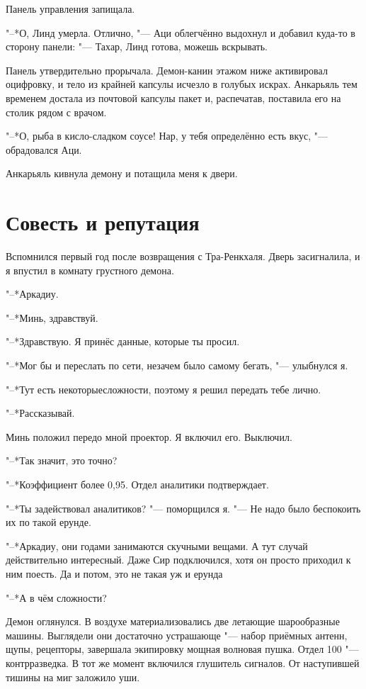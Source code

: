 Панель управления запищала.

"--*О, Линд умерла.
Отлично, "--- Аци облегчённо выдохнул и добавил куда-то в сторону панели:
"--- Тахар, Линд готова, можешь вскрывать.

Панель утвердительно прорычала.
Демон-канин этажом ниже активировал оцифровку, и тело из крайней капсулы исчезло в голубых искрах.
Анкарьяль тем временем достала из почтовой капсулы пакет и, распечатав, поставила его на столик рядом с врачом.

"--*О, рыба в кисло-сладком соусе!
Нар, у тебя определённо есть вкус, "--- обрадовался Аци.

Анкарьяль кивнула демону и потащила меня к двери.

\section{Совесть и репутация}

Вспомнился первый год после возвращения с Тра-Ренкхаля.
Дверь засигналила, и я впустил в комнату грустного демона.

"--*Аркадиу.

"--*Минь, здравствуй.

"--*Здравствую.
Я принёс данные, которые ты просил.

"--*Мог бы и переслать по сети, незачем было самому бегать, "--- улыбнулся я.

"--*Тут есть некоторые\ldotst сложности, поэтому я решил передать тебе лично.

"--*Рассказывай.

Минь положил передо мной проектор.
Я включил его.
Выключил.

"--*Так значит, это точно?

"--*Коэффициент более 0,95.
Отдел аналитики подтверждает.

"--*Ты задействовал аналитиков? "--- поморщился я.
"--- Не надо было беспокоить их по такой ерунде.

"--*Аркадиу, они годами занимаются скучными вещами.
А тут случай действительно интересный.
Даже Сир подключился, хотя он просто приходил к ним поесть.
Да и потом, это не такая уж и ерунда\ldotst

"--*А в чём сложности?

Демон оглянулся.
В воздухе материализовались две летающие шарообразные машины.
Выглядели они достаточно устрашающе "--- набор приёмных антенн, щупы, рецепторы, завершала экипировку мощная волновая пушка.
Отдел 100 "--- контрразведка.
В тот же момент включился глушитель сигналов.
От наступившей тишины на миг заложило уши.

